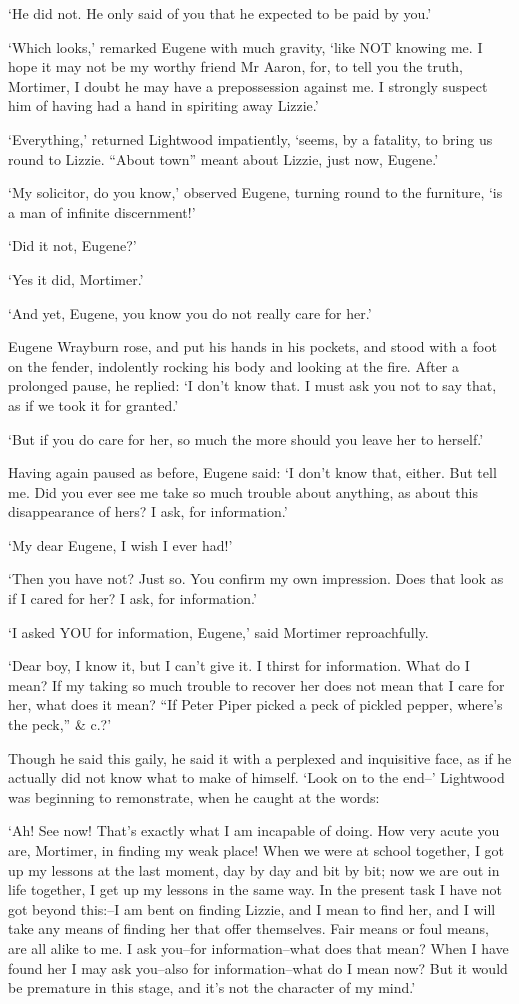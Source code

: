 ‘He did not. He only said of you that he expected to be paid by you.’

‘Which looks,’ remarked Eugene with much gravity, ‘like NOT knowing me.
I hope it may not be my worthy friend Mr Aaron, for, to tell you the
truth, Mortimer, I doubt he may have a prepossession against me. I
strongly suspect him of having had a hand in spiriting away Lizzie.’

‘Everything,’ returned Lightwood impatiently, ‘seems, by a fatality,
to bring us round to Lizzie. “About town” meant about Lizzie, just now,
Eugene.’

‘My solicitor, do you know,’ observed Eugene, turning round to the
furniture, ‘is a man of infinite discernment!’

‘Did it not, Eugene?’

‘Yes it did, Mortimer.’

‘And yet, Eugene, you know you do not really care for her.’

Eugene Wrayburn rose, and put his hands in his pockets, and stood with a
foot on the fender, indolently rocking his body and looking at the fire.
After a prolonged pause, he replied: ‘I don’t know that. I must ask you
not to say that, as if we took it for granted.’

‘But if you do care for her, so much the more should you leave her to
herself.’

Having again paused as before, Eugene said: ‘I don’t know that, either.
But tell me. Did you ever see me take so much trouble about anything, as
about this disappearance of hers? I ask, for information.’

‘My dear Eugene, I wish I ever had!’

‘Then you have not? Just so. You confirm my own impression. Does that
look as if I cared for her? I ask, for information.’

‘I asked YOU for information, Eugene,’ said Mortimer reproachfully.

‘Dear boy, I know it, but I can’t give it. I thirst for information.
What do I mean? If my taking so much trouble to recover her does not
mean that I care for her, what does it mean? “If Peter Piper picked a
peck of pickled pepper, where’s the peck,” \& c.?’

Though he said this gaily, he said it with a perplexed and inquisitive
face, as if he actually did not know what to make of himself. ‘Look on
to the end--’ Lightwood was beginning to remonstrate, when he caught at
the words:

‘Ah! See now! That’s exactly what I am incapable of doing. How very
acute you are, Mortimer, in finding my weak place! When we were at
school together, I got up my lessons at the last moment, day by day and
bit by bit; now we are out in life together, I get up my lessons in the
same way. In the present task I have not got beyond this:--I am bent
on finding Lizzie, and I mean to find her, and I will take any means
of finding her that offer themselves. Fair means or foul means, are all
alike to me. I ask you--for information--what does that mean? When I
have found her I may ask you--also for information--what do I mean now?
But it would be premature in this stage, and it’s not the character of
my mind.’

